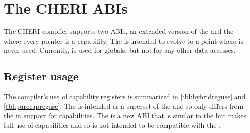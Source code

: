 \chapter{The CHERI ABIs}
\label{chp:abis}
\label{chap:abis} %

The CHERI compiler supports two ABIs, an extended version of the \mipsABI{} and the \sandboxABI{} where every pointer is a capability.
The \sandboxABI{} is intended to evolve to a point where  is never used.
Currently,  is used for globals, but not for any other data accesses.

\section{Register usage}

The compiler's use of capability registers is summarized in \autoref{tbl:hybridreguse} and \autoref{tbl:purecapreguse}.
The \hybridABI{} is intended as a superset of the \mipsABI{} and so only differs from the \mipsABI{} in support for capabilities.
The \sandboxABI{} is a new ABI that is similar to the \mipsABI{} but makes full use of capabilities and so is not intended to be compatible with the \mipsABI{}.

